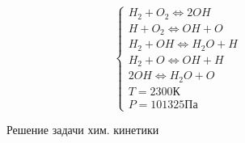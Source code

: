 %         

$$
\begin{cases}
    H_2 + O_2 \Longleftrightarrow 2OH\\
    H + O_2 \Longleftrightarrow OH + O\\
    H_2 + OH \Longleftrightarrow H_2O + H\\
    H_2 + O \Longleftrightarrow OH + H\\
    2OH \Longleftrightarrow H_2O + O\\
    T = 2300\text{К}\\
    P = 101325\text{Па}
\end{cases}
$$

\begin{figure}
    
    \caption{Решение задачи хим. кинетики}
    \label{fig:chem1}
\end{figure}

